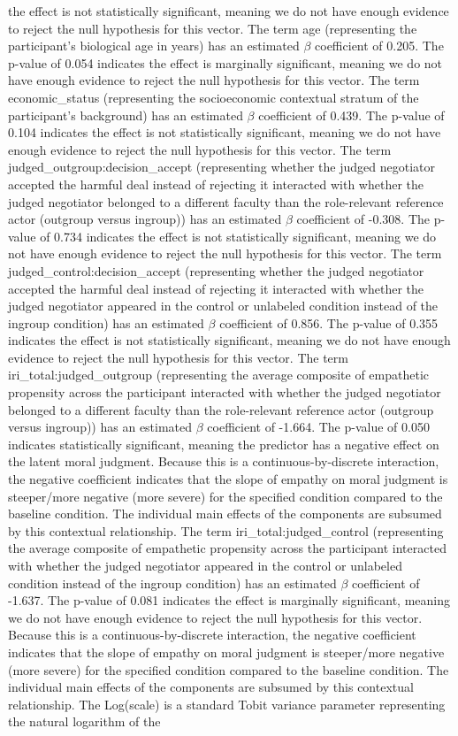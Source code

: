 \documentclass[11pt]{article}
\begin{document}
the effect is not statistically significant, meaning we do not have enough evidence to reject the null hypothesis for this vector. The term age (representing the participant's biological age in years) has an estimated $\beta$ coefficient of 0.205. The p-value of 0.054 indicates the effect is marginally significant, meaning we do not have enough evidence to reject the null hypothesis for this vector. The term economic\_status (representing the socioeconomic contextual stratum of the participant's background) has an estimated $\beta$ coefficient of 0.439. The p-value of 0.104 indicates the effect is not statistically significant, meaning we do not have enough evidence to reject the null hypothesis for this vector. The term judged\_outgroup:decision\_accept (representing whether the judged negotiator accepted the harmful deal instead of rejecting it interacted with whether the judged negotiator belonged to a different faculty than the role-relevant reference actor (outgroup versus ingroup)) has an estimated $\beta$ coefficient of -0.308. The p-value of 0.734 indicates the effect is not statistically significant, meaning we do not have enough evidence to reject the null hypothesis for this vector. The term judged\_control:decision\_accept (representing whether the judged negotiator accepted the harmful deal instead of rejecting it interacted with whether the judged negotiator appeared in the control or unlabeled condition instead of the ingroup condition) has an estimated $\beta$ coefficient of 0.856. The p-value of 0.355 indicates the effect is not statistically significant, meaning we do not have enough evidence to reject the null hypothesis for this vector. The term iri\_total:judged\_outgroup (representing the average composite of empathetic propensity across the participant interacted with whether the judged negotiator belonged to a different faculty than the role-relevant reference actor (outgroup versus ingroup)) has an estimated $\beta$ coefficient of -1.664. The p-value of 0.050 indicates statistically significant, meaning the predictor has a negative effect on the latent moral judgment. Because this is a continuous-by-discrete interaction, the negative coefficient indicates that the slope of empathy on moral judgment is steeper/more negative (more severe) for the specified condition compared to the baseline condition. The individual main effects of the components are subsumed by this contextual relationship. The term iri\_total:judged\_control (representing the average composite of empathetic propensity across the participant interacted with whether the judged negotiator appeared in the control or unlabeled condition instead of the ingroup condition) has an estimated $\beta$ coefficient of -1.637. The p-value of 0.081 indicates the effect is marginally significant, meaning we do not have enough evidence to reject the null hypothesis for this vector. Because this is a continuous-by-discrete interaction, the negative coefficient indicates that the slope of empathy on moral judgment is steeper/more negative (more severe) for the specified condition compared to the baseline condition. The individual main effects of the components are subsumed by this contextual relationship. The Log(scale) is a standard Tobit variance parameter representing the natural logarithm of the 
\end{document}
